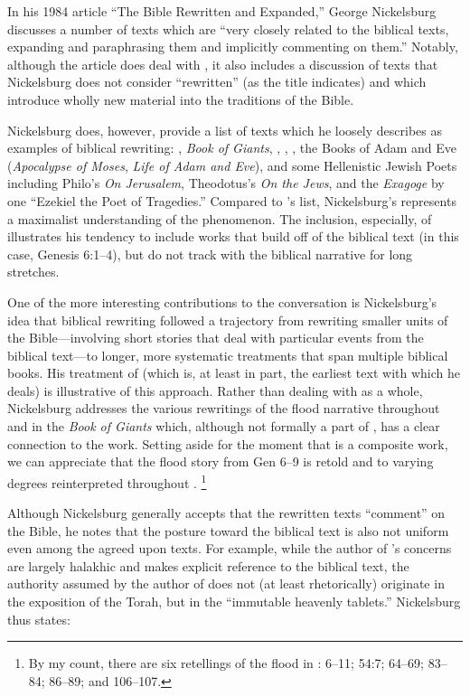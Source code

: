 In his 1984 article ``The Bible Rewritten and Expanded,'' George Nickelsburg discusses a number of texts which are ``very closely related to the biblical texts, expanding and paraphrasing them and implicitly commenting on them.''%
    \autocite[89]{nickelsburg_stone1984}
Notably, although the article does deal with \rwb, it also includes a discussion of texts that Nickelsburg does not consider ``rewritten'' (as the title indicates) and which introduce wholly new material into the traditions of the Bible.%
    \autocite[89--90]{nickelsburg_stone1984}

Nickelsburg does, however, provide a list of texts which he loosely describes as examples of biblical rewriting: \firstenoch, \emph{Book of Giants}, \jub, \ga, \antiquities, the Books of Adam and Eve (\emph{Apocalypse of Moses}, \emph{Life of Adam and Eve}), and some Hellenistic Jewish Poets including Philo's \emph{On Jerusalem}, Theodotus's \emph{On the Jews}, and the \emph{Exagoge} by one ``Ezekiel the Poet of Tragedies.'' Compared to \vermes's list, Nickelsburg's represents a maximalist understanding of the \rwb phenomenon. The inclusion, especially, of \firstenoch illustrates his tendency to include works that build off of the biblical text (in this case, Genesis 6:1--4), but do not track with the biblical narrative for long stretches. 

One of the more interesting contributions to the conversation is Nickelsburg's idea that biblical rewriting followed a trajectory from rewriting smaller units of the Bible---involving short stories that deal with particular events from the biblical text---to longer, more systematic treatments that span multiple biblical books. His treatment of \firstenoch (which is, at least in part, the earliest text with which he deals) is illustrative of this approach. Rather than dealing with \firstenoch as a whole, Nickelsburg addresses the various rewritings of the flood narrative throughout \firstenoch and in the \emph{Book of Giants} which, although not formally a part of \firstenoch, has a clear connection to the work.%
    \autocite[90--97]{nickelsburg_stone1984}
Setting aside for the moment that \firstenoch is a composite work, we can appreciate that the flood story from Gen 6--9 is retold and to varying degrees reinterpreted throughout \firstenoch.%
    \footnote{%
        By my count, there   are six retellings of the flood in \firstenoch: 6--11; 54:7; 64--69;   83--84; 86--89; and 106--107.} 

Although Nickelsburg generally accepts that the rewritten texts ``comment'' on the Bible, he notes that the posture toward the biblical text is also not uniform even among the agreed upon \rwb texts. For example, while the author of \jub's concerns are largely halakhic and makes explicit reference to the biblical text, the authority assumed by the author of \jub does not (at least rhetorically) originate in the exposition of the Torah, but in the ``immutable heavenly tablets.''%
    \autocite[100--101]{nickelsburg_stone1984}
Nickelsburg thus states: 


